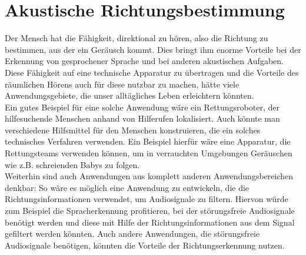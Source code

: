 \section{Akustische Richtungsbestimmung} Der Mensch hat die Fähigkeit, direktional zu hören, also die Richtung zu bestimmen, aus der ein Geräusch kommt. Dies bringt ihm enorme Vorteile bei der Erkennung von gesprochener Sprache und bei anderen akustischen Aufgaben. Diese Fähigkeit auf eine technische Apparatur zu übertragen und die Vorteile des räumlichen Hörens auch für diese nutzbar zu machen, hätte viele Anwendungsgebiete, die unser alltägliches Leben erleichtern könnten.\\
Ein gutes Beispiel für eine solche Anwendung wäre ein Rettungsroboter, der hilfesuchende Menschen anhand von Hilferufen lokalisiert. Auch könnte man verschiedene Hilfsmittel für den Menschen konstruieren, die ein solches technisches Verfahren verwenden. Ein Beispiel hierfür wäre eine Apparatur, die Rettungsteams verwenden können, um in verrauchten Umgebungen Geräuschen wie z.B. schreienden Babys zu folgen.\\ 
Weiterhin sind auch Anwendungen aus komplett anderen Anwendungsbereichen denkbar: So wäre es möglich eine Anwendung zu entwickeln, die die Richtungsinformationen verwendet, um Audiosignale zu filtern. Hiervon würde zum Beispiel die Spracherkennung profitieren, bei der  störungsfreie Audiosignale benötigt werden und diese mit Hilfe der Richtungsinformationen aus dem Signal gefiltert werden könnten\cite{Spracherkennung}. Auch andere Anwendungen, die störungsfreie Audiosignale benötigen, könnten die Vorteile der Richtungserkennung nutzen. 
